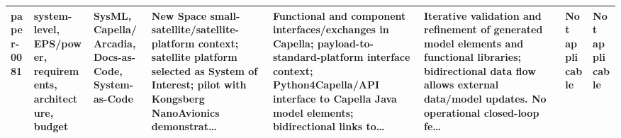 \documentclass[10pt]{article}
\begin{document}
\begin{landscape}
\begin{longtable}{p{1.1cm}p{3.1cm}p{2.5cm}p{3.3cm}p{4.0cm}p{3.5cm}p{2.8cm}p{2.8cm}}
paper-0081 & system-level, EPS/power, requirements, architecture, budget & SysML, Capella/Arcadia, Docs-as-Code, System-as-Code & New Space small-satellite/satellite-platform context; satellite platform selected as System of Interest; pilot with Kongsberg NanoAvionics demonstrat… & Functional and component interfaces/exchanges in Capella; payload-to-standard-platform interface context; Python4Capella/API interface to Capella Java model elements; bidirectional links to… & Iterative validation and refinement of generated model elements and functional libraries; bidirectional data flow allows external data/model updates. No operational closed-loop fe… & Not applicable & Not applicable \\
\bottomrule
\end{longtable}
\normalsize
\end{landscape}
\end{document}
